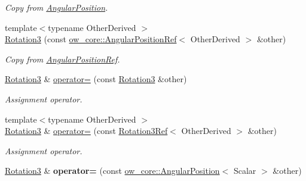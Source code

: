 \begin{DoxyCompactItemize}
\begin{DoxyCompactList}\small\item\em Copy from \hyperlink{classow__core_1_1AngularPosition}{Angular\+Position}. \end{DoxyCompactList}\item 
{\footnotesize template$<$typename Other\+Derived $>$ }\\\hyperlink{classow__core_1_1Rotation3_af9cfe962b9b8a799fc9705cae857a315}{Rotation3} (const \hyperlink{classow__core_1_1AngularPositionRef}{ow\+\_\+core\+::\+Angular\+Position\+Ref}$<$ Other\+Derived $>$ \&other)\hypertarget{classow__core_1_1Rotation3_af9cfe962b9b8a799fc9705cae857a315}{}\label{classow__core_1_1Rotation3_af9cfe962b9b8a799fc9705cae857a315}

\begin{DoxyCompactList}\small\item\em Copy from \hyperlink{classow__core_1_1AngularPositionRef}{Angular\+Position\+Ref}. \end{DoxyCompactList}\item 
\hyperlink{classow__core_1_1Rotation3}{Rotation3} \& \hyperlink{classow__core_1_1Rotation3_a21fc1630e58466797644aad5c74e0531}{operator=} (const \hyperlink{classow__core_1_1Rotation3}{Rotation3} \&other)\hypertarget{classow__core_1_1Rotation3_a21fc1630e58466797644aad5c74e0531}{}\label{classow__core_1_1Rotation3_a21fc1630e58466797644aad5c74e0531}

\begin{DoxyCompactList}\small\item\em Assignment operator. \end{DoxyCompactList}\item 
{\footnotesize template$<$typename Other\+Derived $>$ }\\\hyperlink{classow__core_1_1Rotation3}{Rotation3} \& \hyperlink{classow__core_1_1Rotation3_afb5952292dd87fe142d8da44542a6902}{operator=} (const \hyperlink{classow__core_1_1Rotation3Ref}{Rotation3\+Ref}$<$ Other\+Derived $>$ \&other)\hypertarget{classow__core_1_1Rotation3_afb5952292dd87fe142d8da44542a6902}{}\label{classow__core_1_1Rotation3_afb5952292dd87fe142d8da44542a6902}

\begin{DoxyCompactList}\small\item\em Assignment operator. \end{DoxyCompactList}\item 
\hyperlink{classow__core_1_1Rotation3}{Rotation3} \& {\bfseries operator=} (const \hyperlink{classow__core_1_1AngularPosition}{ow\+\_\+core\+::\+Angular\+Position}$<$ Scalar $>$ \&other)\hypertarget{classow__core_1_1Rotation3_a578be4e7c7f919383eaaee3b52dc6129}{}\label{classow__core_1_1Rotation3_a578be4e7c7f919383eaaee3b52dc6129}


\end{DoxyCompactItemize}
